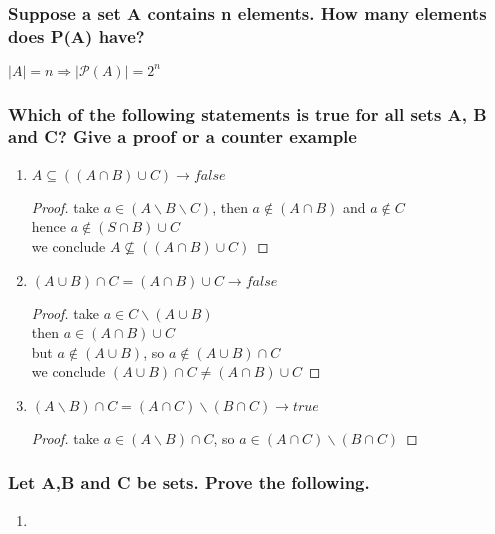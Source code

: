 \subsubsection{Suppose a set A contains n elements. How many elements does P(A) have?}
$|A| = n \Rightarrow |\mathcal{P}(A)| = 2^n$

\subsubsection{Which of the following statements is true for all sets A, B and C? Give a proof or a counter example}
\begin{enumerate}[label=(\alph*)]
    \item $A \subseteq ((A \cap B) \cup C) \rightarrow false$ 
    \begin{proof}[Proof]
        take $a \in (A\backslash B \backslash C)$, then $a \not\in (A\cap B)$ and $a \not\in C$ \\
        hence $a \not\in (S\cap B) \cup C $\\
        we conclude $A \not \subseteq ((A\cap B)\cup C)$
    \end{proof}
    \item $(A\cup B) \cap C = (A\cap B)\cup C \rightarrow false$
    \begin{proof}[Proof]
        take $a \in C\backslash (A\cup B)$\\
        then $a \in (A \cap B) \cup C$ \\
        but $a \not\in (A \cup B)$, so $a \not\in (A\cup B) \cap C$\\
        we conclude $(A \cup B) \cap C \ne (A \cap B) \cup C$
    \end{proof}
    \item $(A \backslash B) \cap C = (A \cap C) \backslash (B \cap C) \rightarrow true$
    \begin{proof}[Proof]
        take $a \in (A \backslash B) \cap C$, so $a \in (A \cap C) \backslash (B \cap C)$
    \end{proof}
\end{enumerate}

\subsubsection*{Let A,B and C be sets. Prove the following.}
    \begin{enumerate}[label=(\alph*)]
        \item
    \end{enumerate}